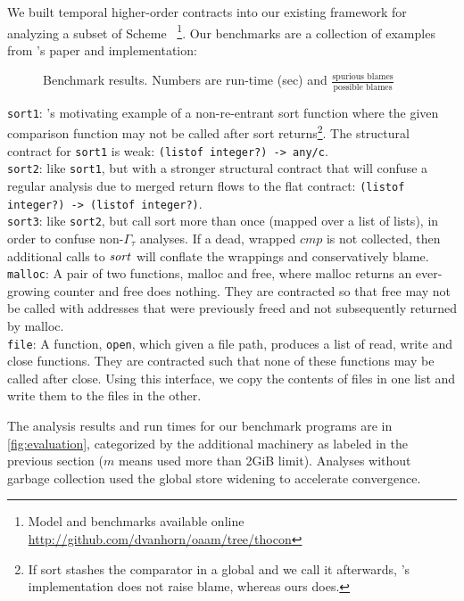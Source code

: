 We built temporal higher-order contracts into our existing framework for analyzing a subset of Scheme~\citep{ianjohnson:oaam:icfp2013} \footnote{Model and benchmarks available online \url{http://github.com/dvanhorn/oaam/tree/thocon}}.
%
Our benchmarks are a collection of examples from \dfm's paper and implementation:
\\
\FloatBarrier
\begin{figure}
  
  \caption{Benchmark results. Numbers are run-time (sec) and $\frac{\text{spurious blames}}{\text{possible blames}}$}
  \label{fig:evaluation}
\end{figure}
\noindent
{\tt sort1}:{ \dfm's motivating example of a non-re-entrant sort function where the given comparison function may not be called after sort returns\footnote{If sort stashes the comparator in a global and we call it afterwards, \dfm's implementation does not raise blame, whereas ours does.}.
%
The structural contract for {\tt sort1} is weak: {\tt (listof integer?) -> any/c}.
}
\\
{\tt sort2}: like {\tt sort1}, but with a stronger structural contract that will confuse a regular analysis due to merged return flows to the flat contract: {\tt (listof integer?) -> (listof integer?)}.
\\
{\tt sort3}: like {\tt sort2}, but call sort more than once (mapped over a list of lists), in order to confuse non-$\Gamma_\tau$ analyses. If a dead, wrapped $\mathit{cmp}$ is not collected, then additional calls to $\mathit{sort}$ will conflate the wrappings and conservatively blame.
\\
{\tt malloc}: A pair of two functions, malloc and free, where malloc returns an ever-growing counter and free does nothing. They are contracted so that free may not be called with addresses that were previously freed and not subsequently returned by malloc.
\\
{\tt file}: A function, {\tt open}, which given a file path, produces a list of read, write and close functions. They are contracted such that none of these functions may be called after close. Using this interface, we copy the contents of files in one list and write them to the files in the other.

The analysis results and run times for our benchmark programs are in \autoref{fig:evaluation}, categorized by the additional machinery as labeled in the previous section ($m$ means used more than 2GiB limit).
%
Analyses without garbage collection used the global store widening to accelerate convergence.

